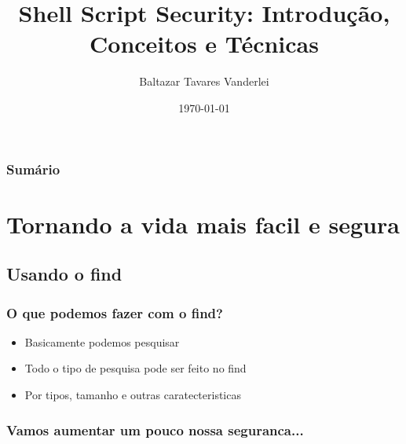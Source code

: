 \documentclass[10pt]{beamer}
\title[]{Shell Script Security: Introdução, Conceitos e Técnicas}
\author[]{Baltazar Tavares Vanderlei}
\date{\today}
\institute[2012]{Laboratório de Computação Científica e Visualização - LCCV/UFAL}
\begin{document}
\newcommand{\til}{\~{}}

\frame{\titlepage}
	\begin{frame}[t]
	\frametitle{Sumário}
	\tableofcontents[framebreaks]
\end{frame}



%
%
%


\section{Tornando a vida mais facil e segura}
	\subsection{Usando o find}
		\begin{frame}%
		\frametitle{O que podemos fazer com o find?}
			\begin{itemize}[<+->]
				\item Basicamente podemos pesquisar
				\item Todo o tipo de pesquisa pode ser feito no find
				\item Por tipos, tamanho e outras caratecteristicas
			\end{itemize}
		\end{frame}

		\begin{frame}%
		\frametitle{Vamos aumentar um pouco nossa seguranca...}
			
		\end{frame}
\end{document}

